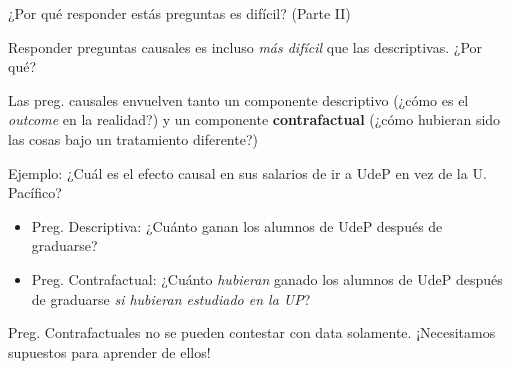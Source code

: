 \documentclass[11pt,handout,aspectratio=169]{beamer}
\newenvironment{wideitemize}{\itemize\addtolength{\itemsep}{10pt}}{\enditemize}
\begin{document}
\begin{frame}{¿Por qué responder estás preguntas es difícil? (Parte II)}
\begin{wideitemize}
	\item
	Responder preguntas causales es incluso \textit{más difícil} que las descriptivas. ¿Por qué?
	
	\pause
	\item
	Las preg. causales envuelven tanto un componente descriptivo (¿cómo es el \textit{outcome} en la realidad?) y un componente \textbf{contrafactual} (¿cómo hubieran sido las cosas bajo un tratamiento diferente?)
	
	\pause
	\item
	Ejemplo: ¿Cuál es el efecto causal en sus salarios de ir a UdeP en vez de la U. Pacífico?
		\begin{itemize}
			\item
			Preg. Descriptiva: ¿Cuánto ganan los alumnos de UdeP después de graduarse?
			
			\item
			Preg. Contrafactual: ¿Cuánto \textit{hubieran} ganado los alumnos de UdeP después de graduarse \textit{si hubieran estudiado en la UP}?
		\end{itemize}
		
	\pause 	
	\item Preg. Contrafactuales no se pueden contestar con data solamente. ¡Necesitamos supuestos para aprender de ellos!
	
\end{wideitemize}	
\end{frame}
\end{document}

